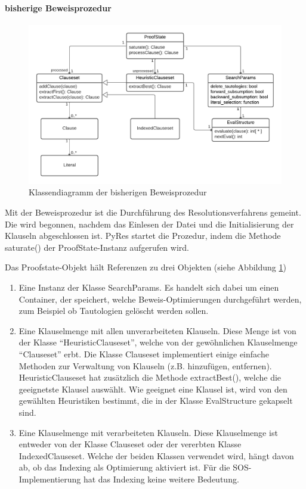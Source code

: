 \paragraph{bisherige Beweisprozedur}
\begin{figure}
	\centering
	\includegraphics[width=1\linewidth]{images/Lucid/PyResProofState}
	\caption{Klassendiagramm der bisherigen Beweisprozedur}
	\label{fig:pyresproofstate}
\end{figure}

Mit der Beweisprozedur ist die Durchführung des Resolutionsverfahrens gemeint. Die wird begonnen, nachdem das Einlesen der Datei und die Initialisierung der Klauseln abgeschlossen ist. PyRes startet die Prozedur, indem die Methode saturate() der ProofState-Instanz aufgerufen wird.

Das Proofstate-Objekt hält Referenzen zu drei Objekten (siehe Abbildung \ref{fig:pyresproofstate})
\begin{enumerate}
	\item Eine Instanz der Klasse SearchParams. Es handelt sich dabei um einen Container, der speichert, welche Beweis-Optimierungen durchgeführt werden, zum Beispiel ob Tautologien gelöscht werden sollen.
	\item Eine Klauselmenge mit allen unverarbeiteten Klauseln. Diese Menge ist von der Klasse "`HeuristicClauseset"', welche von der gewöhnlichen Klauselmenge "`Clauseset"' erbt. Die Klasse Clauseset implementiert einige einfache Methoden zur Verwaltung von Klauseln (z.B. hinzufügen, entfernen). HeuristicClauseset hat zusätzlich die Methode extractBest(), welche die geeignetste Klausel auswählt. Wie geeignet eine Klausel ist, wird von den gewählten Heuristiken bestimmt, die in der Klasse EvalStructure gekapselt sind.
	\item Eine Klauselmenge mit verarbeiteten Klauseln. Diese Klauselmenge ist entweder von der Klasse Clauseset oder der vererbten Klasse IndexedClauseset. Welche der beiden Klassen verwendet wird, hängt davon ab, ob das Indexing als Optimierung aktiviert ist. Für die SOS-Implementierung hat das Indexing keine weitere Bedeutung.
\end{enumerate}

